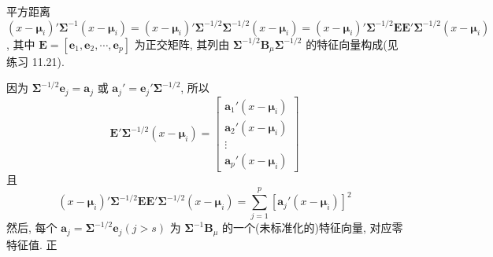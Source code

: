 \noindent{}\quad 平方距离$(x-\boldsymbol{\mu}_i)'\boldsymbol{\Sigma}^{-1}(x-\boldsymbol{\mu}_i)=(x-\boldsymbol{\mu}_i)'\boldsymbol{\Sigma}^{-1/2}\boldsymbol{\Sigma}^{-1/2}(x-\boldsymbol{\mu}_i)=(x-\boldsymbol{\mu}_i)'\boldsymbol{\Sigma}^{-1/2}\mathbf{E}\mathbf{E}'\boldsymbol{\Sigma}^{-1/2}(x-\boldsymbol{\mu}_i)$, 其中 $\mathbf{E}=[\mathbf{e}_1,\mathbf{e}_2,\cdots,\mathbf{e}_p]$ 为正交矩阵, 其列由 $\boldsymbol{\Sigma}^{-1/2}\mathbf{B}_\mu\boldsymbol{\Sigma}^{-1/2}$ 的特征向量构成(见练习 11.21).

因为 $\boldsymbol{\Sigma}^{-1/2}\mathbf{e}_j=\mathbf{a}_j$ 或 $\mathbf{a}_j'=\mathbf{e}_j'\boldsymbol{\Sigma}^{-1/2}$, 所以
\[
\mathbf{E}'\boldsymbol{\Sigma}^{-1/2}(x-\boldsymbol{\mu}_i)=\begin{bmatrix}\mathbf{a}_1'(x-\boldsymbol{\mu}_i)\\\mathbf{a}_2'(x-\boldsymbol{\mu}_i)\\\vdots\\\mathbf{a}_p'(x-\boldsymbol{\mu}_i)\end{bmatrix}
\]
且
\[
(x-\boldsymbol{\mu}_i)'\boldsymbol{\Sigma}^{-1/2}\mathbf{E}\mathbf{E}'\boldsymbol{\Sigma}^{-1/2}(x-\boldsymbol{\mu}_i)=\sum_{j=1}^{p}[\mathbf{a}_j'(x-\boldsymbol{\mu}_i)]^2
\]
然后, 每个 $\mathbf{a}_j=\boldsymbol{\Sigma}^{-1/2}\mathbf{e}_j(j>s)$ 为 $\boldsymbol{\Sigma}^{-1}\mathbf{B}_\mu$ 的一个(未标准化的)特征向量, 对应零特征值. 正
